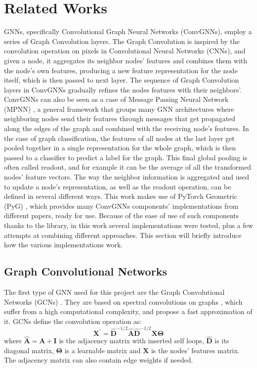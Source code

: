 \documentclass[journal]{IEEEtran}
\begin{document}
\section{Related Works}
\label{sec:rel-works}
GNNs, specifically Convolutional Graph Neural Networks (ConvGNNs), employ a series of Graph Convolution layers.
The Graph Convolution is inspired by the convolution operation on pixels in Convolutional Neural Networks (CNNs), and given a node, it aggregates its neighbor nodes' features and combines them with the node's own features, producing a new feature representation for the node itself, which is then passed to next layer.
The sequence of Graph Convolution layers in ConvGNNs gradually refines the nodes features with their neighbors'.
ConvGNNs can also be seen as a case of Message Passing Neural Network (MPNN) \cite{gilmer2017mpnn}, a general framework that groups many GNN architectures where neighboring nodes send their features through messages that get propagated along the edges of the graph and combined with the receiving node's features.
In the case of graph classification, the features of all nodes at the last layer get pooled together in a single representation for the whole graph, which is then passed to a classifier to predict a label for the graph.
This final global pooling is often called readout, and for example it can be the average of all the transformed nodes' feature vectors.
The way the neighbor information is aggregated and used to update a node's representation, as well as the readout operation, can be defined in several different ways.
This work makes use of PyTorch Geometric (PyG) \cite{fey2019pyg}, which provides many ConvGNNs components' implementations from different papers, ready for use.
Because of the ease of use of such components thanks to the library, in this work several implementations were tested, plus a few attempts at combining different approaches.
This section will briefly introduce how the various implementations work.


\subsection{Graph Convolutional Networks}
\label{sec:gcn}
The first type of GNN used for this project are the Graph Convolutional Networks (GCNs) \cite{kipf2016gcn}.
They are based on spectral convolutions on graphs \cite{bruna2014spectralcnn}, which suffer from a high computational complexity, and propose a fast approximation of it.
GCNs define the convolution operation as:
\begin{equation}
    \mathbf{X}^{\prime} = \mathbf{\hat{D}}^{-1/2} \mathbf{\hat{A}} \mathbf{\hat{D}}^{-1/2} \mathbf{X} \mathbf{\Theta}
\end{equation}
where $\mathbf{\hat{A}} = \mathbf{A} + \mathbf{I}$ is the adjacency matrix with inserted self loops, $\mathbf{\hat{D}}$ is its diagonal matrix, $\mathbf{\Theta}$ is a learnable matrix and $\mathbf{X}$ is the nodes' features matrix.
The adjacency matrix can also contain edge weights if needed.
\end{document}
